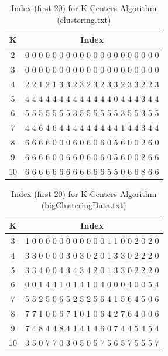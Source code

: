 \begin{description}
\begin{description}
\begin{table}[H]
	\centering
	\caption{Index (first 20) for K-Centers Algorithm (clustering.txt)}
	\label{table:index_kcenter_clustering}	
	\begin{tabular}{ c | c }
		\hline \hline
		K        &    Index  \\[0.1cm]
		\hline
		2     &  0 0 0 0 0 0 0 0 0 0 0 0 0 0 0 0 0 0 0 0 \\[0.1cm]
		3     &  0 0 0 0 0 0 0 0 0 0 0 0 0 0 0 0 0 0 0 0 \\[0.1cm]
		4     &  2 2 1 2 1 3 3 2 3 2 3 2 3 3 2 3 3 2 2 3 \\[0.1cm]
		5     &  4 4 4 4 4 4 4 4 4 4 4 4 4 0 4 4 4 3 4 4 \\[0.1cm]
		6     &  5 5 5 5 5 5 5 3 5 5 5 5 5 5 3 5 5 3 5 5 \\[0.1cm]
		7     &  4 4 6 4 6 4 4 4 4 4 4 4 4 4 1 4 4 3 4 4 \\[0.1cm]
		8     &  6 6 6 6 0 0 0 6 0 6 0 6 0 5 6 0 0 2 6 0 \\[0.1cm]
		9     &  6 6 6 6 0 0 6 6 0 6 0 6 0 5 6 0 0 2 6 6 \\[0.1cm]
		10   &  6 6 6 6 6 6 6 6 6 6 6 6 5 5 0 6 6 8 6 6 \\[0.1cm]
		\hline	
	\end{tabular}
\end{table}

\begin{table}[H]
	\centering
	\caption{Index (first 20) for K-Centers Algorithm (bigClusteringData.txt)}
	\label{table:index_kcenter_bigClustering}	
	\begin{tabular}{ c | c }
		\hline \hline
		K    & Index \\[0.1cm]
		\hline
		3     &  1 0 0 0 0 0 0 0 0 0 0 0 1 1 0 0 2 0 2 0 \\[0.1cm]
		4     &  3 3 0 0 0 0 3 0 3 0 2 0 1 3 3 0 2 2 2 0 \\[0.1cm]
		5     &  3 3 4 0 0 4 3 4 3 4 2 0 1 3 3 0 2 2 2 0 \\[0.1cm]
		6     &  0 0 1 4 4 1 0 1 4 1 0 4 0 0 0 4 0 0 5 4 \\[0.1cm]
		7     &  5 5 2 5 0 6 5 2 5 2 5 6 4 1 5 6 4 5 0 6 \\[0.1cm]
		8     &  7 7 1 0 0 6 7 1 0 1 0 6 4 2 7 6 4 0 0 6 \\[0.1cm]
		9     &  7 4 8 4 4 8 4 1 4 1 4 6 0 7 4 4 5 4 5 4 \\[0.1cm]
		10   &  3 5 0 7 7 0 3 0 5 0 5 7 5 6 5 7 5 5 5 7 \\[0.1cm]
		\hline	
	\end{tabular}
\end{table}


\end{description}
\end{description}
